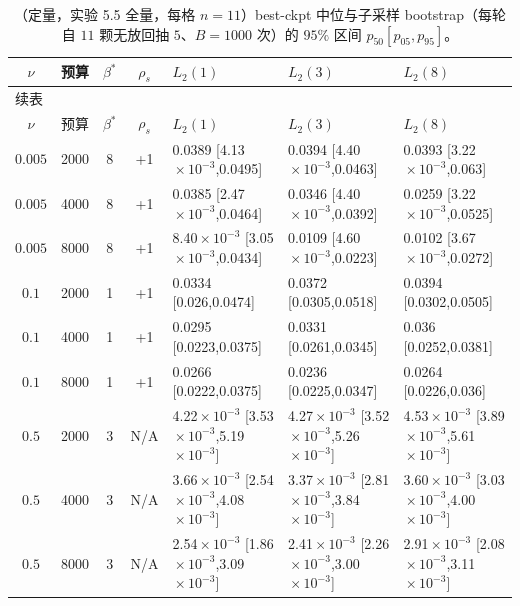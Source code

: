 \documentclass[fontset=windows,11pt]{ctexart}
\numberwithin{equation}{section}
\begin{document}
{\setlength{\tabcolsep}{2pt}%
\begin{longtable}{cccclll}
\caption{（定量，实验 5.5 全量，每格 $n=11$）best-ckpt 中位与子采样 bootstrap（每轮自 $11$ 颗无放回抽 $5$、$B=1000$ 次）的 $95\%$ 区间 $p_{50}[p_{05},p_{95}]$。}\label{tab:app-r2}\\
\toprule
$\nu$&预算&$\beta^*$&$\rho_s$&$L_2(1)$&$L_2(3)$&$L_2(8)$\\\midrule\endfirsthead
\multicolumn{7}{l}{\small 续表}\\\toprule
$\nu$&预算&$\beta^*$&$\rho_s$&$L_2(1)$&$L_2(3)$&$L_2(8)$\\\midrule\endhead
$0.005$ & 2000 & 8 & +1 & 0.0389 [4.13$\!\times\!10^{-3}$,0.0495] & 0.0394 [4.40$\!\times\!10^{-3}$,0.0463] & 0.0393 [3.22$\!\times\!10^{-3}$,0.063] \\
$0.005$ & 4000 & 8 & +1 & 0.0385 [2.47$\!\times\!10^{-3}$,0.0464] & 0.0346 [4.40$\!\times\!10^{-3}$,0.0392] & 0.0259 [3.22$\!\times\!10^{-3}$,0.0525] \\
$0.005$ & 8000 & 8 & +1 & 8.40$\!\times\!10^{-3}$ [3.05$\!\times\!10^{-3}$,0.0434] & 0.0109 [4.60$\!\times\!10^{-3}$,0.0223] & 0.0102 [3.67$\!\times\!10^{-3}$,0.0272] \\
$0.1$ & 2000 & 1 & +1 & 0.0334 [0.026,0.0474] & 0.0372 [0.0305,0.0518] & 0.0394 [0.0302,0.0505] \\
$0.1$ & 4000 & 1 & +1 & 0.0295 [0.0223,0.0375] & 0.0331 [0.0261,0.0345] & 0.036 [0.0252,0.0381] \\
$0.1$ & 8000 & 1 & +1 & 0.0266 [0.0222,0.0375] & 0.0236 [0.0225,0.0347] & 0.0264 [0.0226,0.036] \\
$0.5$ & 2000 & 3 & N/A & 4.22$\!\times\!10^{-3}$ [3.53$\!\times\!10^{-3}$,5.19$\!\times\!10^{-3}$] & 4.27$\!\times\!10^{-3}$ [3.52$\!\times\!10^{-3}$,5.26$\!\times\!10^{-3}$] & 4.53$\!\times\!10^{-3}$ [3.89$\!\times\!10^{-3}$,5.61$\!\times\!10^{-3}$] \\
$0.5$ & 4000 & 3 & N/A & 3.66$\!\times\!10^{-3}$ [2.54$\!\times\!10^{-3}$,4.08$\!\times\!10^{-3}$] & 3.37$\!\times\!10^{-3}$ [2.81$\!\times\!10^{-3}$,3.84$\!\times\!10^{-3}$] & 3.60$\!\times\!10^{-3}$ [3.03$\!\times\!10^{-3}$,4.00$\!\times\!10^{-3}$] \\
$0.5$ & 8000 & 3 & N/A & 2.54$\!\times\!10^{-3}$ [1.86$\!\times\!10^{-3}$,3.09$\!\times\!10^{-3}$] & 2.41$\!\times\!10^{-3}$ [2.26$\!\times\!10^{-3}$,3.00$\!\times\!10^{-3}$] & 2.91$\!\times\!10^{-3}$ [2.08$\!\times\!10^{-3}$,3.11$\!\times\!10^{-3}$]\\\bottomrule
\end{longtable}
}%
\end{document}
